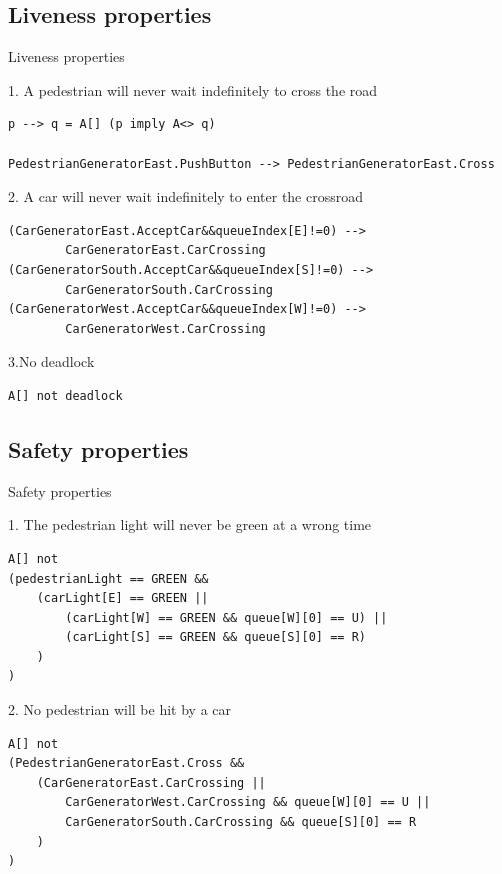 \documentclass{bredelebeamer}
\begin{document}
\subsection{Liveness properties}
\begin{frame}[fragile]{Liveness properties}

\begin{block}{1. A pedestrian will never wait indefinitely to cross the road}
\begin{verbatim}
p --> q = A[] (p imply A<> q)

PedestrianGeneratorEast.PushButton --> PedestrianGeneratorEast.Cross
\end{verbatim}
\end{block}

\begin{block}{2. A car will never wait indefinitely to enter the crossroad}
\begin{verbatim}
(CarGeneratorEast.AcceptCar&&queueIndex[E]!=0) -->
        CarGeneratorEast.CarCrossing
(CarGeneratorSouth.AcceptCar&&queueIndex[S]!=0) -->
        CarGeneratorSouth.CarCrossing
(CarGeneratorWest.AcceptCar&&queueIndex[W]!=0) -->
        CarGeneratorWest.CarCrossing
\end{verbatim}
\end{block}

\begin{block}{3.No deadlock}
\begin{verbatim}
A[] not deadlock
\end{verbatim}
\end{block}

\end{frame}

\subsection{Safety properties}
\begin{frame}[fragile]{Safety properties}
\begin{block}{1. The pedestrian light will never be green at a wrong time}
\begin{verbatim}
A[] not
(pedestrianLight == GREEN &&
    (carLight[E] == GREEN ||
        (carLight[W] == GREEN && queue[W][0] == U) ||
        (carLight[S] == GREEN && queue[S][0] == R)
    )
)
\end{verbatim}
\end{block}

\begin{block}{2. No pedestrian will be hit by a car}
\begin{verbatim}
A[] not
(PedestrianGeneratorEast.Cross &&
    (CarGeneratorEast.CarCrossing ||
        CarGeneratorWest.CarCrossing && queue[W][0] == U ||
        CarGeneratorSouth.CarCrossing && queue[S][0] == R
    )
)
\end{verbatim}
\end{block}
\end{frame}
\end{document}
